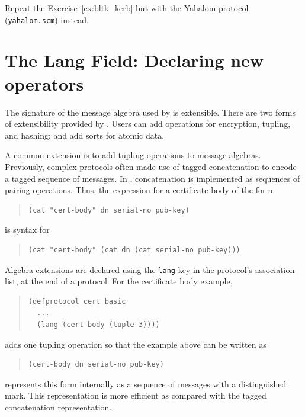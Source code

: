 \begin{exercise}
Repeat the Exercise~\ref{ex:bltk_kerb} but with the Yahalom protocol
(\texttt{yahalom.scm}) instead.
\end{exercise}

\section{The Lang Field:  Declaring new operators}
\label{sec:algebra:lang:field}

The signature of the message algebra used by {\cpsa} is extensible.
There are two forms of extensibility provided by {\cpsa}.  Users can
add operations for encryption, tupling, and hashing; and
add sorts for atomic data.

A common extension is to add tupling operations to message algebras.
Previously, complex protocols often made use of tagged concatenation
to encode a tagged sequence of messages.  In {\cpsa}, concatenation is
implemented as sequences of pairing operations.  Thus, the expression
for a certificate body of the form
\begin{quote}
\begin{verbatim}
(cat "cert-body" dn serial-no pub-key)
\end{verbatim}
\end{quote}
is syntax for
\begin{quote}
\begin{verbatim}
(cat "cert-body" (cat dn (cat serial-no pub-key)))
\end{verbatim}
\end{quote}

Algebra extensions are declared using the \texttt{lang} key in the
protocol's association list, at the end of a protocol.  For the
certificate body example,
\begin{quote}
\begin{verbatim}
(defprotocol cert basic
  ...
  (lang (cert-body (tuple 3))))
\end{verbatim}
\end{quote}
adds one tupling operation so that the example above can be written as
\begin{quote}
\begin{verbatim}
(cert-body dn serial-no pub-key)
\end{verbatim}
\end{quote}
{\cpsa} represents this form internally as a sequence of messages with a
distinguished mark.  This representation is more efficient as compared
with the tagged concatenation representation.

